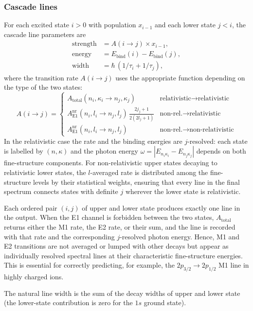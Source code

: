 \documentclass[11pt,a4paper]{article}
\newcommand{\E}{\mathrm{E}}
\newcommand{\nr}{\mathrm{nr}}
\begin{document}
\subsubsection*{Cascade lines}
For each excited state $i>0$ with population $x_{i-1}$ and each lower
state $j<i$, the cascade line parameters are
\begin{align}
\text{strength} &= A(i\to j) \times x_{i-1},\\
\text{energy}   &= E_{\text{bind}}(i) - E_{\text{bind}}(j),\\
\text{width}    &= \hbar\,(1/\tau_{i} + 1/\tau_{j}),
\end{align}
where the transition rate $A(i\to j)$ uses the appropriate function
depending on the type of the two states:
\[
A(i\to j) =
\begin{cases}
A_{\text{total}}(n_{i},\kappa_{i}\to n_{j},\kappa_{j}) &
  \text{relativistic} \to \text{relativistic} \\[4pt]
A_{\E1}^{\nr}(n_{i},l_{i}\to n_{j},l_{j})\,
\displaystyle\frac{2j_{j}+1}{2(2l_{j}+1)} &
  \text{non-rel.} \to \text{relativistic} \\[4pt]
A_{\E1}^{\nr}(n_{i},l_{i}\to n_{j},l_{j}) &
  \text{non-rel.} \to \text{non-relativistic}
\end{cases}
\]
In the relativistic case the rate and the binding energies are
$j$-resolved: each state is labelled by $(n,\kappa)$ and the photon
energy $\omega = |E_{n_{i}\kappa_{i}} - E_{n_{j}\kappa_{j}}|$ depends on
both fine-structure components.  For non-relativistic upper states
decaying to relativistic lower states, the $l$-averaged rate is
distributed among the fine-structure levels by their statistical weights,
ensuring that every line in the final spectrum connects states with
definite $j$ wherever the lower state is relativistic.

Each ordered pair $(i,j)$ of upper and lower state produces exactly one
line in the output.  When the E1 channel is forbidden between the two
states, $A_{\text{total}}$ returns either the M1 rate, the E2 rate, or
their sum, and the line is recorded with that rate and the corresponding
$j$-resolved photon energy.  Hence, M1 and E2 transitions are not
averaged or lumped with other decays but appear as individually resolved
spectral lines at their characteristic fine-structure energies.  This is
essential for correctly predicting, for example, the $2p_{3/2}\to2p_{1/2}$
M1 line in highly charged ions.

The natural line width is the sum of the decay widths of upper and lower
state (the lower-state contribution is zero for the $1s$ ground state).
\end{document}
